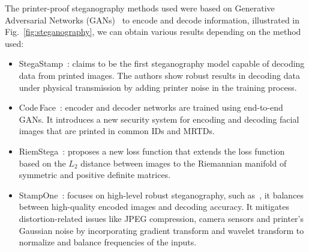 The printer-proof steganography methods used were based on Generative Adversarial Networks (GANs)~\cite{gans2018} to encode and decode information, illustrated in Fig.~\ref{fig:steganography}, we can obtain various results depending on the method used:

\begin{itemize}
    \item StegaStamp~\cite{stegastamp2020}: claims to be the first steganography model capable of decoding data from printed images. The authors show robust results in decoding data under physical transmission by adding printer noise in the training process.
    \item Code\,Face~\cite{codeface2021}: encoder and decoder networks are trained using end-to-end GANs. It introduces a new security system for encoding and decoding facial images that are printed in common IDs and MRTDs.
    \item RiemStega~\cite{cruz2025riemstega}: proposes a new loss function that extends the loss function based on the $L_2$ distance between images to the Riemannian manifold of symmetric and positive definite matrices.
    \item StampOne~\cite{stampone2024}: focuses on high-level robust steganography, such as~\cite{codeface2021, stegastamp2020}, it balances between high-quality encoded images and decoding accuracy. It mitigates distortion-related issues like JPEG compression, camera sensors and printer's Gaussian noise by incorporating gradient transform and wavelet transform to normalize and balance frequencies of the inputs. 
\end{itemize}

